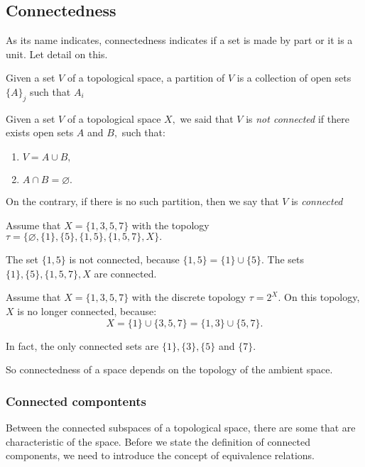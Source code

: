 \documentclass[
	fontsize=10pt, %
	twoside=false, %
	secnumdepth=1, %
]{kaobook}
\begin{document}
\subsection{Connectedness}

As its name indicates, connectedness indicates if a set is made by part or it is a unit. Let detail on this. 

\begin{definition}
Given a set $V$ of a topological space, a partition of $V$ is a collection of open sets $\{A\}_j$ such that $A_i$
\end{definition}

\begin{definition}
Given a set $V$ of a topological space $X,$ we said that $V$ is \emph{not connected} if there exists open sets $A$ and $B,$ such that:
\begin{enumerate}
\item $V=A\cup B,$
\item $A\cap B =\varnothing.$
\end{enumerate}

On the contrary, if there is no such partition, then we say that $V$ is \emph{connected}
\end{definition}

\begin{example}
Assume that $X=\{1,3,5,7\}$ with the topology $\tau=\{\varnothing,\{1\},\{5\},\{1,5\},\{1,5,7\},X\}.$ 

The set $\{1,5\}$ is not connected, because $\{1,5\}=\{1\}\cup\{5\}.$ The sets $\{1\},\{5\},\{1,5,7\}, X$ are connected. 
\end{example}

\begin{example}
Assume that $X=\{1,3,5,7\}$ with the discrete topology $\tau=2^X.$ On this topology, $X$ is no longer connected, because: $$X=\{1\}\cup\{3,5,7\}=\{1,3\}\cup\{5,7\}.$$

In fact, the only connected sets are $\{1\},\{3\},\{5\}$ and $\{7\}.$
\end{example}

So connectedness of a space depends on the topology of the ambient space. 

\subsubsection{Connected compontents}

Between the connected subspaces of a topological space, there are some that are characteristic of the space. Before we state the definition of connected components, we need to introduce the concept of equivalence relations.
\end{document}
